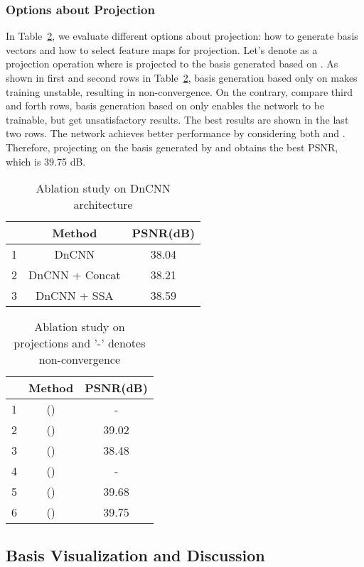 \documentclass[final]{cvpr}
\begin{document}
\subsubsection{Options about Projection}


In Table~\ref{tab:abl study proj}, we evaluate different options about projection: how to generate basis vectors and how to select feature maps for projection. Let's denote  as a projection operation where  is projected to the basis generated based on . As shown in first and second rows in Table~\ref{tab:abl study proj}, basis generation based  only on  makes training unstable, resulting in non-convergence. On the contrary, compare third and forth rows, basis generation based on only  enables the network to be trainable, but get unsatisfactory results. The best results are shown in the last two rows. The network achieves better performance by considering both  and . Therefore, projecting  on the basis generated by  and  obtains the best PSNR, which is 39.75 dB.
\begin{table}[t]
    \centering
    \begin{tabular}{ccc}
    \toprule
     & Method  & PSNR(dB)\\
    \midrule
    1 & DnCNN & 38.04 \\
2 & DnCNN + Concat & 38.21\\
    3 & DnCNN + SSA & 38.59 \\
    \bottomrule
    \end{tabular}
    \caption{Ablation study on DnCNN architecture}
    \label{tab:abl dncnn}
\end{table} \begin{table}[t]
    \centering
    \begin{tabular}{ccc}
    \toprule
     & Method  & PSNR(dB) \\
    \midrule
    1 & () & - \\
2 & () & 39.02\\
3 & () & 38.48\\
    4 & () & - \\
    5 & () & 39.68 \\
    6 & () & 39.75 \\
    \bottomrule
    \end{tabular}
    \caption{Ablation study on projections and '-' denotes non-convergence}
    \label{tab:abl study proj}
\end{table} 


   
\subsection{Basis Visualization and Discussion}
\end{document}
